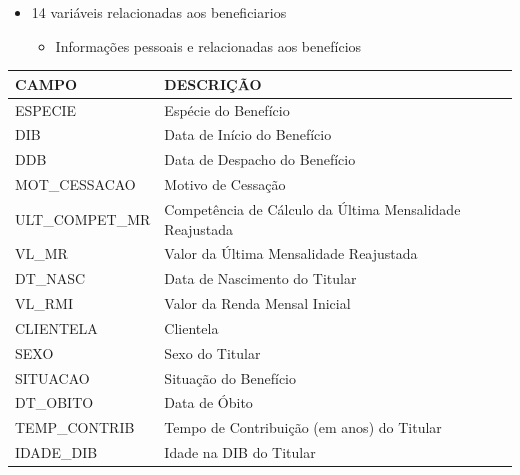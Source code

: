 \begin{frame}
  \begin{block}{}
    \begin{itemize}
      \item \alert{14 variáveis} relacionadas aos beneficiarios
      \begin{itemize}
        \item Informações pessoais e relacionadas aos benefícios
      \end{itemize}
    \end{itemize}
  \end{block}    
  
  \begin{table}[]
    \begin{tabular}{|l|l|}
      \hline
      {\tiny CAMPO}           & {\tiny DESCRIÇÃO}                                               \\ \hline
      {\tiny ESPECIE}         & {\tiny Espécie do Benefício}                                    \\ \hline
      {\tiny DIB}             & {\tiny Data de Início do Benefício}                             \\ \hline
      {\tiny DDB}             & {\tiny Data de Despacho do Benefício}                           \\ \hline
      {\tiny MOT\_CESSACAO}   & {\tiny Motivo de Cessação}                                      \\ \hline
      {\tiny ULT\_COMPET\_MR} & {\tiny Competência de Cálculo da Última Mensalidade Reajustada} \\ \hline
      {\tiny VL\_MR}          & {\tiny Valor da Última Mensalidade Reajustada}                  \\ \hline
      {\tiny DT\_NASC}        & {\tiny Data de Nascimento do Titular}                           \\ \hline
      {\tiny VL\_RMI}         & {\tiny Valor da Renda Mensal Inicial}                           \\ \hline
      {\tiny CLIENTELA}       & {\tiny Clientela}                                               \\ \hline
      {\tiny SEXO}            & {\tiny Sexo do Titular}                                         \\ \hline
      {\tiny SITUACAO}        & {\tiny Situação do Benefício }                                  \\ \hline
      {\tiny DT\_OBITO}       & {\tiny Data de Óbito}                                           \\ \hline
      {\tiny TEMP\_CONTRIB}   & {\tiny Tempo de Contribuição (em anos) do Titular}              \\ \hline
      {\tiny IDADE\_DIB}      & {\tiny Idade na DIB do Titular}                                 \\ \hline
    \end{tabular}
  \end{table}
\end{frame}

